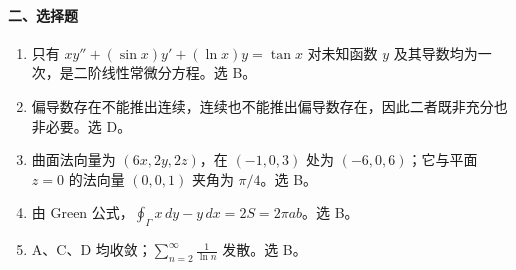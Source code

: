 \paragraph*{二、选择题}
\begin{enumerate}
  \item 只有 \(xy''+(\sin x)y'+(\ln x)y=\tan x\) 对未知函数 $y$ 及其导数均为一次，是二阶线性常微分方程。选 B。
  \item 偏导数存在不能推出连续，连续也不能推出偏导数存在，因此二者既非充分也非必要。选 D。
  \item 曲面法向量为 \((6x,2y,2z)\)，在 $(-1,0,3)$ 处为 $(-6,0,6)$；它与平面 $z=0$ 的法向量 $(0,0,1)$ 夹角为 $\pi/4$。选 B。
  \item 由 Green 公式，\(\displaystyle \oint_\Gamma x\,dy-y\,dx=2S=2\pi ab\)。选 B。
  \item A、C、D 均收敛；\(\displaystyle \sum_{n=2}^{\infty}\frac1{\ln n}\) 发散。选 B。
\end{enumerate}

